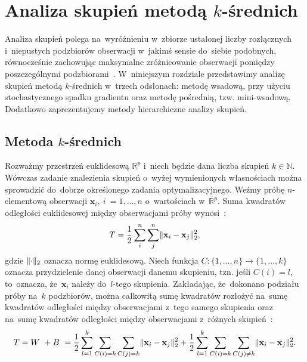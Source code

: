 \documentclass{praca1}
\DeclarePairedDelimiter{\norm}{\lVert}{\rVert}
\begin{document}
\chapter{Analiza skupień metodą $k$-średnich}
\label{analiza-skupien}

Analiza skupień polega na~wyróżnieniu w~zbiorze ustalonej liczby rozłącznych i~niepustych podzbiorów obserwacji w~jakimś sensie do~siebie podobnych, równocześnie zachowując maksymalne zróżnicowanie obserwacji pomiędzy poszczególnymi podzbiorami~\cite{Koronacki2005:statystyczne}. W~niniejszym rozdziale przedstawimy analizę skupień metodą $k$-średnich w~trzech odsłonach: metodę wsadową, przy użyciu stochastycznego spadku gradientu oraz metodę pośrednią, tzw. mini-wsadową. Dodatkowo zaprezentujemy metody hierarchiczne analizy skupień.

\section{Metoda $k$-średnich}

Rozważmy przestrzeń euklidesową $\mathbb{R}^p$ i~niech będzie dana liczba skupień $k\in \mathbb{N}$. Wówczas zadanie znalezienia skupień o~wyżej wymienionych własnościach można sprowadzić do~dobrze określonego zadania optymalizacyjnego. Weźmy próbę $n$-elementową obserwacji $\mathbf{x}_i,\ i~= 1,\ldots,n$ o~wartościach w~$\mathbb{R}^p$. %
Suma kwadratów odległości euklidesowej między obserwacjami próby wynosi~\cite{Koronacki2005:statystyczne}:
\begin{equation}
T = \frac{1}{2}\sum\limits_{i}^{n}\sum\limits_{j}^{n} \norm{\mathbf{x}_i - \mathbf{x}_j}_2^2,
\end{equation}
gdzie $\norm{\cdot}_2$ oznacza normę euklidesową. Niech funkcja $C:\{1,\ldots,n\} \rightarrow \{1,\ldots, k\}$ oznacza przydzielenie danej obserwacji danemu skupieniu, tzn. jeśli $C(i) = l$, to~oznacza, że~$\mathbf{x}_i$ należy do~$l$-tego skupienia. Zakładając, że~dokonano podziału próby na~$k$ podzbiorów, można całkowitą sumę kwadratów rozłożyć na~sumę kwadratów odległości między obserwacjami z~tego samego skupienia oraz na~sumę kwadratów odległości między obserwacjami z~różnych skupień~\cite{Koronacki2005:statystyczne}:
\begin{equation}
T = W~+ B~= \frac{1}{2}\sum\limits_{l=1}^{k}\sum\limits_{C(i) = k}\sum\limits_{C(j) = k} \norm{\mathbf{x}_i - \mathbf{x}_j}_2^2 + \frac{1}{2}\sum\limits_{l=1}^{k}\sum\limits_{C(i) = k}\sum\limits_{C(j) \neq k} \norm{\mathbf{x}_i - \mathbf{x}_j}_2^2.
\end{equation}
\end{document}
